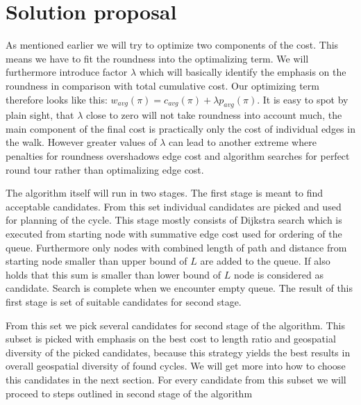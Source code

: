 \documentclass{ctuthesis}
\begin{document}
\chapter{Solution proposal}
As mentioned earlier we will try to optimize two components of the cost. This means we have to fit the roundness into the optimalizing term. We will furthermore introduce factor \(\lambda\) which will basically identify the emphasis on the roundness in comparison with total cumulative cost. Our optimizing term therefore looks like this: \(w_{avg}(\pi) = c_{avg}(\pi) + \lambda p_{avg}(\pi)\). It is easy to spot by plain sight, that \(\lambda\) close to zero will not take roundness into account much, the main component of the final cost is practically only the cost of individual edges in the walk. However greater values of \(\lambda\) can lead to another extreme where penalties for roundness overshadows edge cost and algorithm searches for perfect round tour rather than optimalizing edge cost. \par
The algorithm itself will run in two stages. The first stage is meant to find acceptable candidates. From this set individual candidates are picked and used for planning of the cycle. This stage mostly consists of Dijkstra search which is executed from starting node with summative edge cost used for ordering of the queue. Furthermore only nodes with combined length of path and distance from starting node smaller than upper bound of \(L\) are added to the queue. If also holds that this sum is smaller than lower bound of \(L\) node is considered as candidate. Search is complete when we encounter empty queue. The result of this first stage is set of suitable candidates for second stage.\par
From this set we pick several candidates for second stage of the algorithm. This subset is picked with emphasis on  the best cost to length ratio and geospatial diversity of the picked candidates, because this strategy yields the best results in overall geospatial diversity of found cycles. We will get more into how to choose this candidates in the next section. For every candidate from this subset we will proceed to steps outlined in second stage of the algorithm \par
\end{document}
